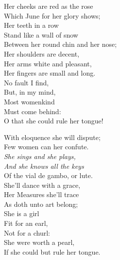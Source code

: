 \settowidth{\versewidth}{Between her round chin and her n}
\begin{dcverse}\begin{patverse}
Her cheeks are red as the rose\\
Which June for her glory shows;\\
Her teeth in a row\\
Stand like a wall of snow\\
Between her round chin and her nose;\\
Her shoulders are decent,\\
Her arms white and pleasant,\\
Her fingers are small and long.\\
No fault I find,\\
But, in my mind,\\
Most womenkind\\
Must come behind:\\
O that she could rule her tongue!
\end{patverse}

\begin{patverse}
With eloquence she will dispute;\\
Few women can her confute.\\
\textit{She sings and she plays,\\
And she knows all the keys}\\
Of the vial de gambo, or lute.\\
She’ll dance with a grace,\\
Her Measures she’ll trace\\
As doth unto art belong;\\
She is a girl\\
Fit for an earl,\\
Not for a churl:\\
She were worth a pearl,\\
If she could but rule her tongue.
\end{patverse}
\end{dcverse}
\pagebreak